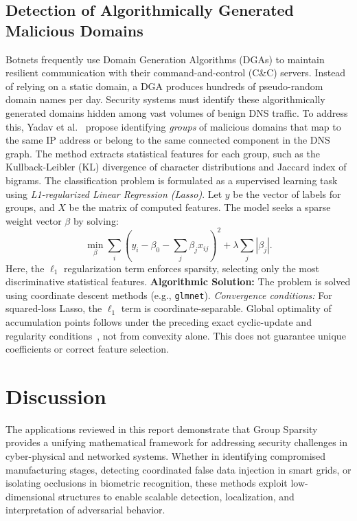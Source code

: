 \documentclass[12pt]{article}
\begin{document}
\subsection{Detection of Algorithmically Generated Malicious Domains}

Botnets frequently use Domain Generation Algorithms (DGAs) to maintain resilient communication with their command-and-control (C\&C) servers. Instead of relying on a static domain, a DGA produces hundreds of pseudo-random domain names per day. Security systems must identify these algorithmically generated domains hidden among vast volumes of benign DNS traffic.
To address this, Yadav et al.~\cite{Yadav2010} propose identifying \textit{groups} of malicious domains that map to the same IP address or belong to the same connected component in the DNS graph. The method extracts statistical features for each group, such as the Kullback-Leibler (KL) divergence of character distributions and Jaccard index of bigrams.
The classification problem is formulated as a supervised learning task using \textit{L1-regularized Linear Regression (Lasso)}. Let $y$ be the vector of labels for groups, and $X$ be the matrix of computed features. The model seeks a sparse weight vector $\beta$ by solving:
\[
    \min_{\beta} \sum_{i} \left( y_i - \beta_0 - \sum_{j} \beta_j x_{ij} \right)^2 + \lambda \sum_{j} |\beta_j|.
\]
Here, the $\ell_1$ regularization term enforces sparsity, selecting only the most discriminative statistical features.
\textbf{Algorithmic Solution:} The problem is solved using coordinate descent methods (e.g., \texttt{glmnet}).
\textit{Convergence conditions:} For squared-loss Lasso, the $\ell_1$ term is coordinate-separable. Global optimality of accumulation points follows under the preceding exact cyclic-update and regularity conditions~\cite{Tseng2001}, not from convexity alone. This does not guarantee unique coefficients or correct feature selection.


\section{Discussion}

The applications reviewed in this report demonstrate that Group Sparsity provides a unifying mathematical framework for addressing security challenges in cyber-physical and networked systems. Whether in identifying compromised manufacturing stages, detecting coordinated false data injection in smart grids, or isolating occlusions in biometric recognition, these methods exploit low-dimensional structures to enable scalable detection, localization, and interpretation of adversarial behavior.
\end{document}
